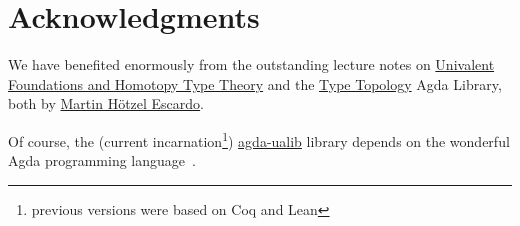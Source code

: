 \documentclass[sigplan,screen]{acmart}
\newcommand{\agdaualib}{\href{https://ualib.org}{agda-ualib}\xspace}
\begin{document}
\section{Acknowledgments}\label{acknowledgments}





We have benefited enormously from the outstanding lecture notes on \href{https://www.cs.bham.ac.uk/~mhe/HoTT-UF-in-Agda-Lecture-Notes}{Univalent Foundations and Homotopy Type Theory} and the \href{https://github.com/martinescardo/TypeTopology}{Type Topology} Agda Library, both by \href{https://www.cs.bham.ac.uk/~mhe}{Martin Hötzel Escardo}.

Of course, the (current incarnation\footnote{previous versions were based on Coq and Lean}) \agdaualib library depends on the wonderful Agda programming language~\cite{Norell:2009}.

\end{document}
